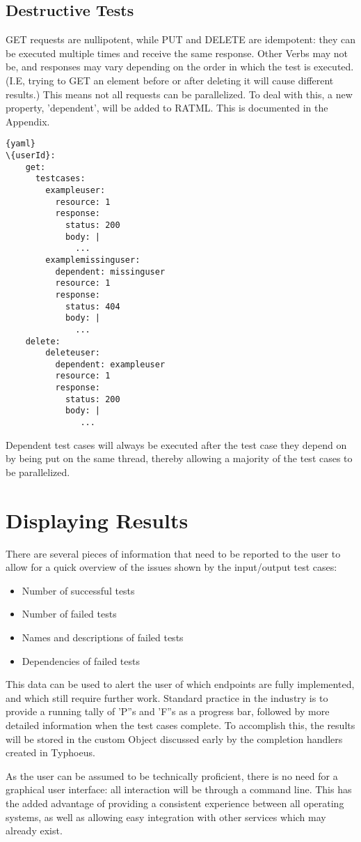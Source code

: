 \subsection{Destructive Tests}

GET requests are nullipotent, while PUT and DELETE are idempotent: they can be executed multiple times and receive the same response. Other Verbs may not be, and responses may vary depending on the order in which the test is executed. (I.E, trying to GET an element before or after deleting it will cause different results.) This means not all requests can be parallelized. To deal with this, a new property, 'dependent', will be added to RATML. This is documented in the Appendix.

\begin{lstlisting}[frame=lines]{yaml}
\{userId}:
    get:
      testcases:
        exampleuser:
          resource: 1
          response: 
            status: 200
            body: |
              ...
        examplemissinguser:
          dependent: missinguser
          resource: 1
          response: 
            status: 404
            body: |
              ...
    delete:
        deleteuser:
          dependent: exampleuser
          resource: 1
          response: 
            status: 200
            body: |
               ...
\end{lstlisting}

Dependent test cases will always be executed after the test case they depend on by being put on the same thread, thereby allowing a majority of the test cases to be parallelized.


\section{Displaying Results}

There are several pieces of information that need to be reported to the user to allow for a quick overview of the issues shown by the input/output test cases:

\begin{itemize}
\item Number of successful tests
\item Number of failed tests
\item Names and descriptions of failed tests
\item Dependencies of failed tests
\end{itemize}

This data can be used to alert the user of which endpoints are fully implemented, and which still require further work. Standard practice in the industry is to provide a running tally of 'P''s and 'F''s as a progress bar, followed by more detailed information when the test cases complete. To accomplish this, the results will be stored in the custom Object discussed early by the completion handlers created in Typhoeus.

As the user can be assumed to be technically proficient, there is no need for a graphical user interface: all interaction will be through a command line. This has the added advantage of providing a consistent experience between all operating systems, as well as allowing easy integration with other services which may already exist.